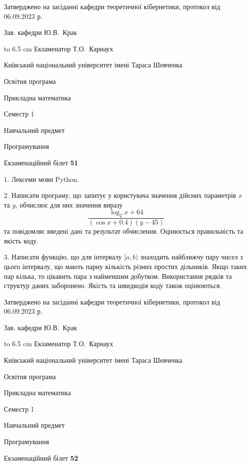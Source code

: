 \documentclass[12pt, ukrainian]{article}
\begin{document}
{\smallskip\smallskip \begin {scriptsize} Затверджено на засіданні кафедри теоретичної кібернетики, протокол   від   06.09.2023 р.\par\smallskip\smallskip\smallskip\smallskip
{\parbox {6.5 cm} {Зав. кафедри \dotfill Ю.В.~Крак}}\hspace {0.7cm} {\hbox to 6.5 cm { Екзаменатор \dotfill Т.О.~Карнаух}} \end{scriptsize}}
\vspace{0.9cm}
{{\begin {scriptsize}\par
{ \center  Київський національний університет імені Тараса Шевченка \par}
{\parbox {5 cm}{Освітня програма \hfill}{\parbox {7 cm}{Прикладна математика\hfill}}\parbox {6 cm}{\hfill Семестр 1}}\par
{\parbox {5 cm} {Навчальний предмет \hfill}\parbox {7 cm}{Програмування \hfill}\parbox {6cm}{\hfill}\par}\vspace{-15pt} \end{scriptsize}}{\center Екзаменаційний білет \No \textbf { 51 }\par}}
{%
1. Лексеми мови Python.%
\par
2. Написати програму, що запитує у користувача значення дійсних параметрів $x$ та $y$, обчислює для них значення виразу 
$$\frac{\log_{2} x + 64}{(\cos x + 0.4) (y - 45)}$$ 
та повiдомляє введенi данi та результат обчислення.
 Оцінюється правильність та якість коду.

\par
3. Написати функцію, що для інтервалу $[a, b)$ знаходить найближчу пару чисел з цього інтервалу, що мають парну кількість різних простих дільників. Якщо таких пар кілька, то цікавить пара з найменшим добутком.  Використання рядків та структур даних заборонено. Якість та швидкодія коду також оцінюються. 

}
{\smallskip\smallskip \begin {scriptsize} Затверджено на засіданні кафедри теоретичної кібернетики, протокол   від   06.09.2023 р.\par\smallskip\smallskip\smallskip\smallskip
{\parbox {6.5 cm} {Зав. кафедри \dotfill Ю.В.~Крак}}\hspace {0.7cm} {\hbox to 6.5 cm { Екзаменатор \dotfill Т.О.~Карнаух}} \end{scriptsize}}
\newpage
{{\begin {scriptsize}\par
{ \center  Київський національний університет імені Тараса Шевченка \par}
{\parbox {5 cm}{Освітня програма \hfill}{\parbox {7 cm}{Прикладна математика\hfill}}\parbox {6 cm}{\hfill Семестр 1}}\par
{\parbox {5 cm} {Навчальний предмет \hfill}\parbox {7 cm}{Програмування \hfill}\parbox {6cm}{\hfill}\par}\vspace{-15pt} \end{scriptsize}}{\center Екзаменаційний білет \No \textbf { 52 }\par}}
\end{document}
